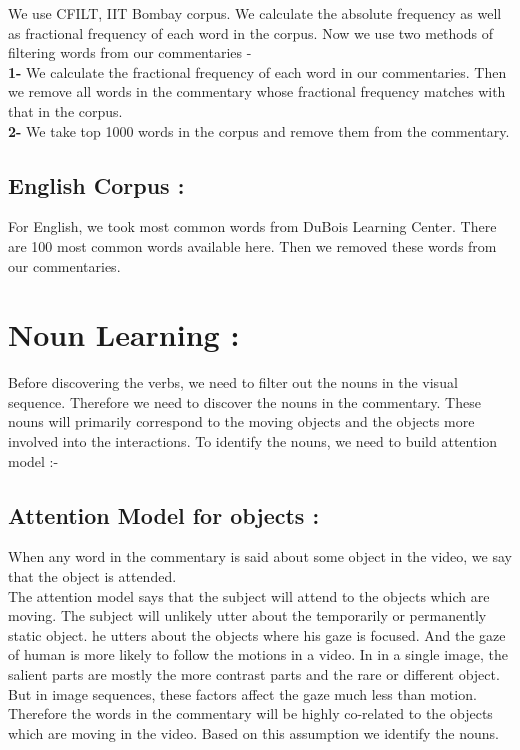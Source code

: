\def\DevnagVersion{2.15}\documentclass[a4paper, 11pt, notitlepage]{report}
\begin{document}
 We use CFILT, IIT Bombay\cite{CFLIT} corpus. We calculate the absolute frequency as well as fractional frequency of each word in the corpus. Now we use two methods of filtering words from our commentaries -\\
\hspace*{10pt} {\bf 1- } We calculate the fractional frequency of each word in our commentaries. Then we remove all words in the commentary whose fractional frequency matches with that in the corpus.\\
\hspace*{10pt} {\bf 2- } We take top 1000 words in the corpus and remove them from the commentary.\\

\subsection{English Corpus :}

For English, we took most common words from DuBois Learning Center\cite{http://www.duboislc.org/EducationWatch/First100Words.html}. There are 100 most common words available here. Then we removed these words from our commentaries.\\

\section{Noun Learning :}

 Before discovering the verbs, we need to filter out the nouns in the visual sequence. Therefore we need to discover the nouns in the commentary. These nouns will primarily correspond to the moving objects and the objects more involved into the interactions. To identify the nouns, we need to build attention model :-

 \subsection{Attention Model for objects :}
 
 When any word in the commentary is said about some object in the video, we say that the object is attended.\\
	The attention model says that the subject will attend to the  objects which are moving. The subject will unlikely utter about the temporarily or permanently static object. he utters about the objects where his gaze is focused. And the gaze of human is more likely to follow the motions in a video\cite{satish-mukerjee-2008icdl}. In in a single image, the salient parts are mostly the more contrast parts and the rare or different object. But in image sequences, these factors affect the gaze much less than motion. Therefore the words in the commentary will be highly co-related to the objects which are moving in the video. Based on this assumption we identify the nouns.\\
\end{document}
